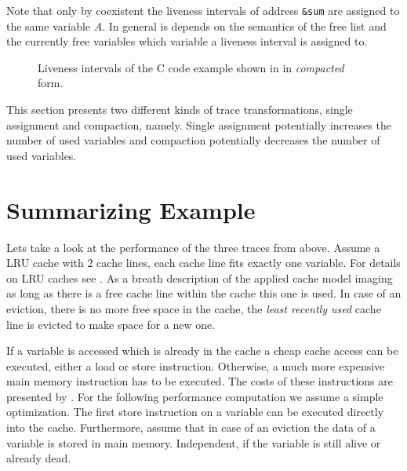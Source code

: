 \documentclass[onecolumn, openright, master, english, signatures]{dbrgrptt}
\begin{document}
\begin{remark}
Note that only by coexistent the liveness intervals of address \texttt{\&sum} are assigned to the same variable $A$. In general is depends on the semantics of the free list and the currently free variables which variable a liveness interval is assigned to.
\end{remark}

\begin{figure}[!ht]
  \centering
  
  \caption{Liveness intervals of the C code example shown in  in \emph{compacted} form.}
  \label{fig:trace-transformation-compact}
\end{figure}

This section presents two different kinds of \ac{trace} transformations, single assignment and compaction, namely. Single assignment potentially increases the number of used variables and compaction potentially decreases the number of used variables.


\section{Summarizing Example}

Lets take a look at the performance of the three \ac{trace}s from above. Assume a \ac{LRU} cache with 2 cache lines, each cache line fits exactly one variable. For details on \ac{LRU} caches see . As a breath description of the applied cache model imaging as long as there is a free cache line within the cache this one is used. In case of an eviction, there is no more free space in the cache, the \emph{least recently used} cache line is evicted to make space for a new one.

If a variable is accessed which is already in the cache a cheap cache access can be executed, either a load or store instruction. Otherwise, a much more expensive main memory instruction has to be executed. The costs of these instructions are presented by . For the following performance computation we assume a simple optimization. The first store instruction on a variable can be executed directly into the cache. Furthermore, assume that in case of an eviction the data of a variable is stored in main memory. Independent, if the variable is still alive or already dead.
\end{document}
